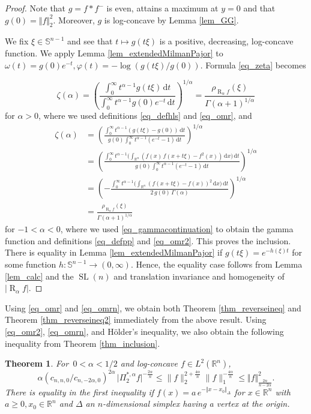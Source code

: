 \documentclass{amsart}
\newtheorem{theorem}{Theorem}
\newcommand{\omr}[1]{\operatorname{R}_{#1}\!}
\newcommand{\sln}{\operatorname{SL}(n)}
\newcommand{\R}{\mathbb R}
\newcommand{\sn}{{\mathbb S}^{n-1}}
\renewcommand{\d}{\,\mathrm{d}}
\newcommand{\vol}[1]{\vert #1\vert}
\begin{document}
\begin{proof}
Note that $g=f*f^-$ is even, attains a maximum at $y=0$ and that $g(0)=\Vert f\Vert_2^2$. Moreover,  $g$ is log-concave by Lemma \ref{lem_GG}. 

We fix $\xi \in \sn$ and see that $t\mapsto g(t \xi)$ is a positive, decreasing, log-concave function. We apply Lemma \ref{lem_extendedMilmanPajor} to $\omega(t) = g(0) e^{-t}, \varphi(t)=-\log(g(t\xi)/g(0))$. Formula \eqref{eq_zeta} becomes

\[
    \zeta(\alpha) 
    = \left(\frac{\int_0^\infty t^{\alpha-1}g(t\xi) \d t}{\int_0^\infty t^{\alpha-1} g(0) e^{-t} \d t} \right)^{1/\alpha}
    = \frac{\rho_{\omr \alpha f}(\xi)}{\Gamma(\alpha+1)^{1/\alpha}}
\]
for $\alpha>0$, where we used definitions \eqref{eq_defhls} and \eqref{eq_omr}, and
\begin{align}
    \zeta(\alpha) 
    &= \left(\frac{\int_0^\infty t^{\alpha-1}( g(t\xi)-g(0)) \d t}{g(0)\int_0^\infty t^{\alpha-1} (e^{-t}-1) \d t} \right)^{1/\alpha}\\
    &= \left(\frac{\int_0^\infty t^{\alpha-1}\big(\int_{\R^n} (f(x)\,f(x+t\xi)-f^2(x))\d x\big) \d t}{g(0)\int_0^\infty t^{\alpha-1} (e^{-t}-1) \d t} \right)^{1/\alpha}\\
      &= \left(-\frac{\int_0^\infty t^{\alpha-1}\big(\int_{\R^n} (f(x+t\xi)-f(x))^2\d x\big) \d t}{2\,g(0)\,\Gamma(\alpha)} \right)^{1/\alpha}\\
      &= \frac{\rho_{\omr \alpha f}(\xi)}{\Gamma(\alpha+1)^{1/\alpha}}
\end{align}
for $-1<\alpha<0$, where we used  \eqref{eq_gammacontinuation} to obtain the gamma function and definitions \eqref{eq_defpp} and \eqref{eq_omr2}.
This proves the inclusion. There is equality in Lemma \ref{lem_extendedMilmanPajor}
 if $g(t \xi) = e^{- h(\xi) t}$ for some function $h: \sn\to (0,\infty)$. Hence, the equality case follows from Lemma \ref{lem_calc} and the $\sln$ and  translation invariance and homogeneity of $\vol{\omr \alpha f}$.
\end{proof}

Using \eqref{eq_omr} and \eqref{eq_omrn}, we obtain both Theorem \ref{thm_reverseineq} and Theorem \ref{thm_reverseineq2} immediately from the above result. Using \eqref{eq_omr2}, \eqref{eq_omrn}, and H\"older's inequality, we also obtain the following inequality from Theorem \ref{thm_inclusion}.

\begin{theorem}\label{thm_reverseineq3}
For $\,0<\alpha<1/2$ and  log-concave $f\in L^2(\R^n)$, 
\[
\alpha (c_{n,n,0}/c_{n,-2\alpha,0})^{2\alpha}\,\vol{\Pi_2^{\ast,\alpha} f}^{-\frac{2\alpha}n} \leq  \|f\|_2^{2+\frac{4\alpha}n} \|f\|_1^{-\frac{4\alpha}n} \leq \Vert f\Vert_{\frac{2n}{n-2\alpha}}^2. \]
There is equality in the first inequality if $f(x)=a\,e^{-\Vert x - x_0\Vert_\Delta}$ for $x\in\R^n$ with $a\ge 0, x_0 \in \R^n$ and $\Delta$ an $n$-dimensional simplex having a vertex at the origin. 
\end{theorem}
\end{document}
